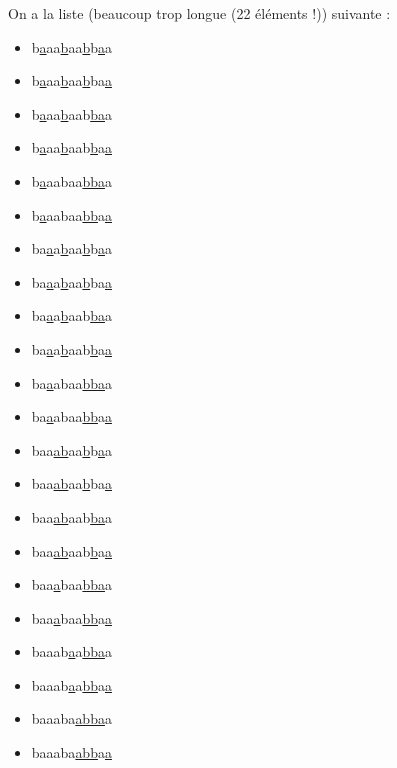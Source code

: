 \begin{correction*}

On a la liste (beaucoup trop longue (22 éléments !)) suivante :

\begin{itemize}
\item b\underline{a}aa\underline{b}aa\underline{b}b\underline{a}a
\item b\underline{a}aa\underline{b}aa\underline{b}ba\underline{a}

\item b\underline{a}aa\underline{b}aab\underline{b}\underline{a}a
\item b\underline{a}aa\underline{b}aab\underline{b}a\underline{a}

\item b\underline{a}aabaa\underline{bb}\underline{a}a
\item b\underline{a}aabaa\underline{bb}a\underline{a}


\item ba\underline{a}a\underline{b}aa\underline{b}b\underline{a}a
\item ba\underline{a}a\underline{b}aa\underline{b}ba\underline{a}

\item ba\underline{a}a\underline{b}aab\underline{b}\underline{a}a
\item ba\underline{a}a\underline{b}aab\underline{b}a\underline{a}

\item ba\underline{a}abaa\underline{bb}\underline{a}a
\item ba\underline{a}abaa\underline{bb}a\underline{a}


\item baa\underline{a}\underline{b}aa\underline{b}b\underline{a}a
\item baa\underline{a}\underline{b}aa\underline{b}ba\underline{a}

\item baa\underline{a}\underline{b}aab\underline{b}\underline{a}a
\item baa\underline{a}\underline{b}aab\underline{b}a\underline{a}

\item baa\underline{a}baa\underline{bb}\underline{a}a
\item baa\underline{a}baa\underline{bb}a\underline{a}


\item baaab\underline{a}a\underline{bb}\underline{a}a
\item baaab\underline{a}a\underline{bb}a\underline{a}

\item baaaba\underline{a}\underline{bb}\underline{a}a
\item baaaba\underline{a}\underline{bb}a\underline{a}

\end{itemize}

\end{correction*}


